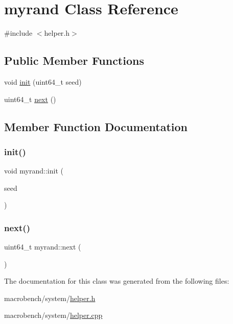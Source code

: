 \hypertarget{classmyrand}{}\section{myrand Class Reference}
\label{classmyrand}


{\ttfamily \#include $<$helper.\+h$>$}

\subsection*{Public Member Functions}
\begin{DoxyCompactItemize}
\item 
void \hyperlink{classmyrand_a0436bc0214f2809892b0d766acce20fa}{init} (uint64\+\_\+t seed)
\item 
uint64\+\_\+t \hyperlink{classmyrand_a65f1c8eaebc7374da94d16ab30f11d5b}{next} ()
\end{DoxyCompactItemize}


\subsection{Member Function Documentation}
\mbox{\label{classmyrand_a0436bc0214f2809892b0d766acce20fa}} 
\subsubsection{\texorpdfstring{init()}{init()}}
{\footnotesize\ttfamily void myrand\+::init (\begin{DoxyParamCaption}\item[{uint64\+\_\+t}]{seed }\end{DoxyParamCaption})}

\mbox{\label{classmyrand_a65f1c8eaebc7374da94d16ab30f11d5b}} 
\subsubsection{\texorpdfstring{next()}{next()}}
{\footnotesize\ttfamily uint64\+\_\+t myrand\+::next (\begin{DoxyParamCaption}{ }\end{DoxyParamCaption})}



The documentation for this class was generated from the following files\+:\begin{DoxyCompactItemize}
\item 
macrobench/system/\hyperlink{helper_8h}{helper.\+h}\item 
macrobench/system/\hyperlink{helper_8cpp}{helper.\+cpp}\end{DoxyCompactItemize}
